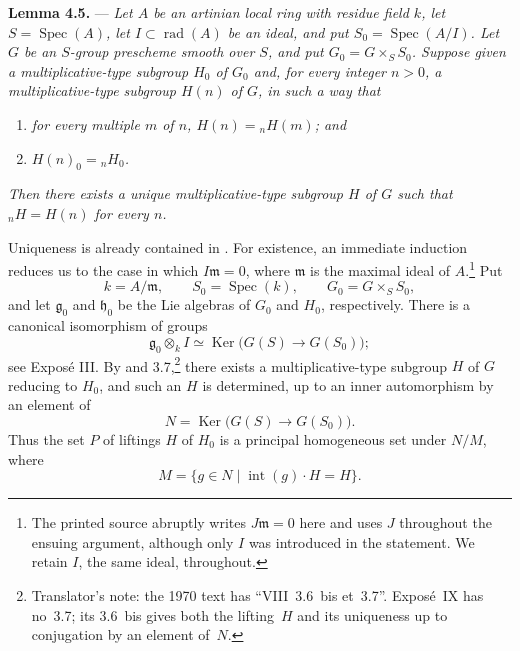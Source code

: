 \medskip
\noindent{}\textbf{Lemma 4.5.} ---
\textit{Let \(A\) be an artinian local ring with residue field
\(k\), let \(S=\operatorname{Spec}(A)\), let
\(I\subset\operatorname{rad}(A)\) be an ideal, and put
\(S_0=\operatorname{Spec}(A/I)\).  Let \(G\) be an \(S\)-group
prescheme smooth over \(S\), and put \(G_0=G\times_SS_0\).  Suppose
given a multiplicative-type subgroup \(H_0\) of \(G_0\) and, for
every integer \(n>0\), a multiplicative-type subgroup \(H(n)\) of
\(G\), in such a way that}
\begin{enumerate}
\item[\SGARefTarget{sga3:xi:lemma:4:5:item:1}\(1^\circ\)]
\textit{for every multiple \(m\) of \(n\),
\(H(n)={}_nH(m)\); and}
\item[\SGARefTarget{sga3:xi:lemma:4:5:item:2}\(2^\circ\)]
\textit{\(H(n)_0={}_nH_0\).}
\end{enumerate}
\textit{Then there exists a unique multiplicative-type subgroup
\(H\) of \(G\) such that \({}_nH=H(n)\) for every \(n\).}

Uniqueness is already contained in \textit{}.  For existence, an
immediate induction reduces us to the case in which
\(I\mathfrak m=0\), where \(\mathfrak m\) is the maximal ideal of
\(A\).\footnote{The printed source abruptly writes
\(J\mathfrak m=0\) here and uses \(J\) throughout the ensuing
argument, although only \(I\) was introduced in the statement.  We
retain \(I\), the same ideal, throughout.} Put
\[
  k=A/\mathfrak m,\qquad
  S_0=\operatorname{Spec}(k),\qquad
  G_0=G\times_SS_0,
\]
and let \(\mathfrak g_0\) and \(\mathfrak h_0\) be the Lie algebras
of \(G_0\) and \(H_0\), respectively.  There is a canonical
isomorphism of groups
\[
  \mathfrak g_0\otimes_kI
  \simeq
  \operatorname{Ker}\bigl(G(S)\longrightarrow G(S_0)\bigr);
\]
see Exposé III.  By  and 3.7,\footnote{Translator's note: the 1970 text has ``VIII~3.6~bis
et~3.7''. Exposé~IX has no~3.7; its 3.6~bis gives both the lifting~\(H\) and its uniqueness up to
conjugation by an element of~\(N\).} there exists a
multiplicative-type subgroup \(H\) of \(G\) reducing to \(H_0\), and
such an \(H\) is determined, up to an inner automorphism by an
element of
\[
  N=\operatorname{Ker}\bigl(G(S)\longrightarrow G(S_0)\bigr).
\]
Thus the set \(P\) of liftings \(H\) of \(H_0\) is a principal
homogeneous set under \(N/M\), where
\[
  M=\{g\in N\mid \operatorname{int}(g)\mathbin{\cdot}H=H\}.
\]

